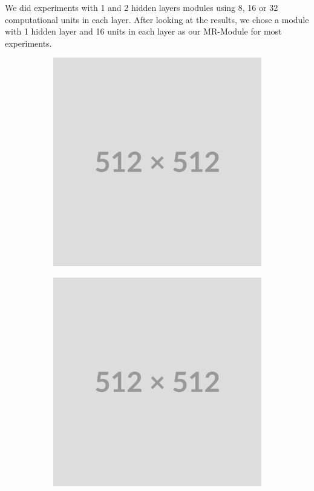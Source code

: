 We did experiments with 1 and 2 hidden layers modules using 8, 16 or 32 computational units in each layer. After looking at the results, we chose a module with 1 hidden layer and 16 units in each layer as our MR-Module for most experiments.

\begin{figure}
    \centering
    \begin{subfigure}[b]{0.3\textwidth}
        \centering
        \includegraphics[width=\textwidth]{img/placeholder512.png}
    \end{subfigure}
    \begin{subfigure}[b]{0.3\textwidth}
        \centering
        \includegraphics[width=\textwidth]{img/placeholder512.png}

\end{subfigure}
\end{figure}
